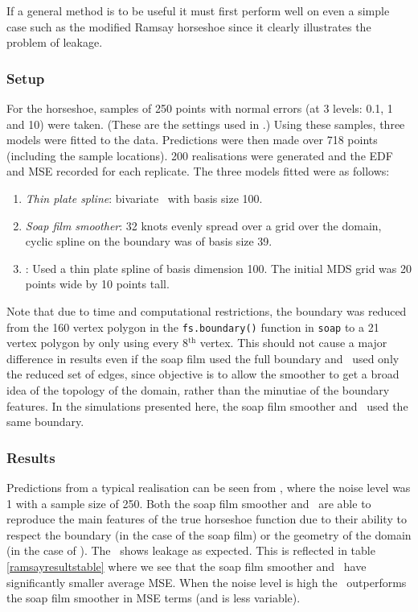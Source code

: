 If a general method is to be useful it must first perform well on even a simple case such as the modified Ramsay horseshoe since it clearly illustrates the problem of leakage.

\subsubsection{Setup}

For the horseshoe, samples of 250 points with normal errors (at 3 levels: 0.1, 1 and 10) were taken. (These are the settings used in \cite{soap}.) Using these samples, three models were fitted to the data. Predictions were then made over 718 points (including the sample locations). 200 realisations were generated and the EDF and MSE recorded for each replicate. The three models fitted were as follows:

\begin{enumerate}
\item \emph{Thin plate spline}: bivariate \tprs\  with basis size 100.
\item \emph{Soap film smoother}: 32 knots evenly spread over a grid over the domain, cyclic spline on the boundary was of basis size 39.
\item \emph{\mdsap}: Used a thin plate spline of basis dimension 100. The initial MDS grid was 20 points wide by 10 points tall.
\end{enumerate} 

Note that due to time and computational restrictions, the boundary was reduced from the 160 vertex polygon in the \texttt{fs.boundary()} function in \texttt{soap} to a 21 vertex polygon by only using every 8$^\text{th}$ vertex. This should not cause a major difference in results even if the soap film used the full boundary and \mdsap\ used only the reduced set of edges, since objective is to allow the smoother to get a broad idea of the topology of the domain, rather than the minutiae of the boundary features. In the simulations presented here, the soap film smoother and \mdsap\ used the same boundary.

\subsubsection{Results}

Predictions from a typical realisation can be seen from , where the noise level was 1 with a sample size of 250. Both the soap film smoother and \mdsap\ are able to reproduce the main features of the true horseshoe function due to their ability to respect the boundary (in the case of the soap film) or the geometry of the domain (in the case of \mdsap). The \tprs\ shows leakage as expected. This is reflected in table \ref{ramsayresultstable} where we see that the soap film smoother and \mdsap\ have significantly smaller average MSE. When the noise level is high the \mdsap\ outperforms the soap film smoother in MSE terms (and is less variable).

